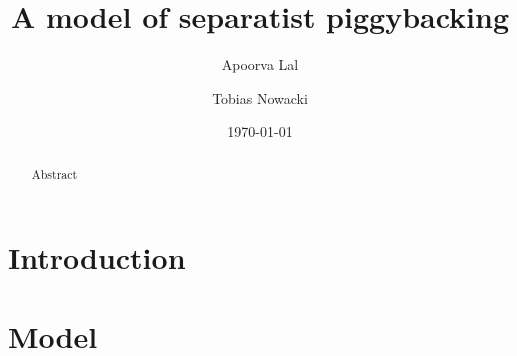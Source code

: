 \documentclass[12pt,reqno]{amsart} %
\title{A model of separatist piggybacking}
\author{Apoorva Lal}
\author{Tobias Nowacki}
\date{\today}
\begin{document}
\begin{abstract} Abstract
\end{abstract}

\maketitle



\section{Introduction} \label{intro}

\lipsum[4]


\section{Model} \label{model}

\lipsum[4]


\renewcommand{\mkbibnamefamily}[1]{\textsc{#1}}
\printbibliography

\appendix


\medskip
\end{document}
